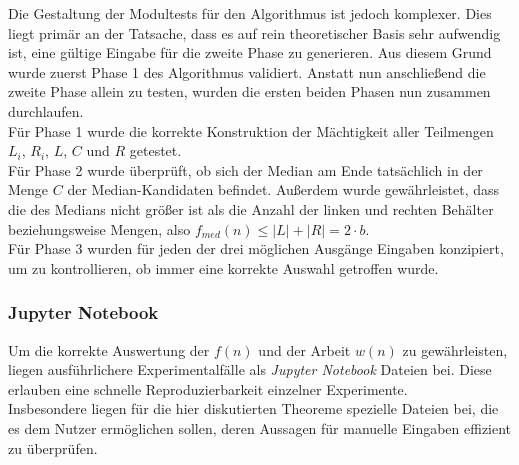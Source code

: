 \noindent
Die Gestaltung der Modultests für den Algorithmus \RM ist jedoch komplexer. Dies liegt primär an der Tatsache, dass es auf rein theoretischer Basis sehr aufwendig ist, eine gültige Eingabe für die zweite Phase zu generieren. Aus diesem Grund wurde zuerst Phase 1 des Algorithmus validiert. Anstatt nun anschließend die zweite Phase allein zu testen, wurden die ersten beiden Phasen nun zusammen durchlaufen.\\[.03cm]
Für Phase 1 wurde die korrekte Konstruktion der Mächtigkeit aller Teilmengen $L_i$, $R_i$, $L$, $C$ und $R$ getestet.\\[.03cm]
Für Phase 2 wurde überprüft, ob sich der Median am Ende tatsächlich in der Menge $C$ der Median-Kandidaten befindet. Außerdem wurde gewährleistet, dass die \fg des Medians \fgM nicht größer ist als die Anzahl der linken und rechten Behälter beziehungsweise Mengen, also $f_{med}(n) \leq |L| + |R| = 2\cdot b$.\\[.03cm]
Für Phase 3 wurden für jeden der drei möglichen Ausgänge Eingaben konzipiert, um zu kontrollieren, ob immer eine korrekte Auswahl getroffen wurde.

\subsubsection{Jupyter Notebook}
Um die korrekte Auswertung der \fg $f(n)$ und der Arbeit $w(n)$ zu gewährleisten, liegen ausführlichere Experimentalfälle als \textit{Jupyter Notebook} Dateien bei. Diese erlauben eine schnelle Reproduzierbarkeit einzelner Experimente.\\
Insbesondere liegen für die hier diskutierten Theoreme spezielle Dateien bei, die es dem Nutzer ermöglichen sollen, deren Aussagen für manuelle Eingaben effizient zu überprüfen.


